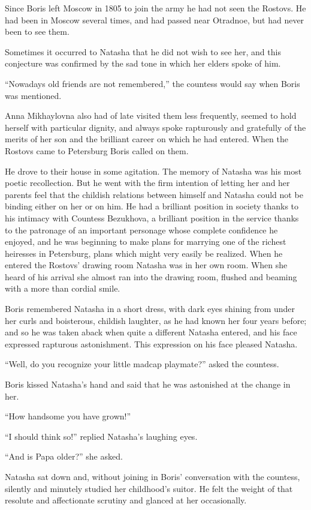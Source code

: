 Since Boris left Moscow in 1805 to join the army he had not seen
the Rostovs. He had been in Moscow several times, and had passed
near Otradnoe, but had never been to see them.

Sometimes it occurred to Natasha that he did not wish to see her,
and this conjecture was confirmed by the sad tone in which her
elders spoke of him.

``Nowadays old friends are not remembered,'' the countess would
say when Boris was mentioned.

Anna Mikhaylovna also had of late visited them less frequently,
seemed to hold herself with particular dignity, and always spoke
rapturously and gratefully of the merits of her son and the
brilliant career on which he had entered. When the Rostovs came
to Petersburg Boris called on them.

He drove to their house in some agitation. The memory of Natasha
was his most poetic recollection. But he went with the firm
intention of letting her and her parents feel that the childish
relations between himself and Natasha could not be binding either
on her or on him. He had a brilliant position in society thanks
to his intimacy with Countess Bezukhova, a brilliant position in
the service thanks to the patronage of an important personage
whose complete confidence he enjoyed, and he was beginning to
make plans for marrying one of the richest heiresses in
Petersburg, plans which might very easily be realized. When he
entered the Rostovs' drawing room Natasha was in her own
room. When she heard of his arrival she almost ran into the
drawing room, flushed and beaming with a more than cordial smile.

Boris remembered Natasha in a short dress, with dark eyes shining
from under her curls and boisterous, childish laughter, as he had
known her four years before; and so he was taken aback when quite
a different Natasha entered, and his face expressed rapturous
astonishment. This expression on his face pleased Natasha.

``Well, do you recognize your little madcap playmate?'' asked the
countess.

Boris kissed Natasha's hand and said that he was astonished at
the change in her.

``How handsome you have grown!''

``I should think so!'' replied Natasha's laughing eyes.

``And is Papa older?'' she asked.

Natasha sat down and, without joining in Boris' conversation with
the countess, silently and minutely studied her childhood's
suitor. He felt the weight of that resolute and affectionate
scrutiny and glanced at her occasionally.

